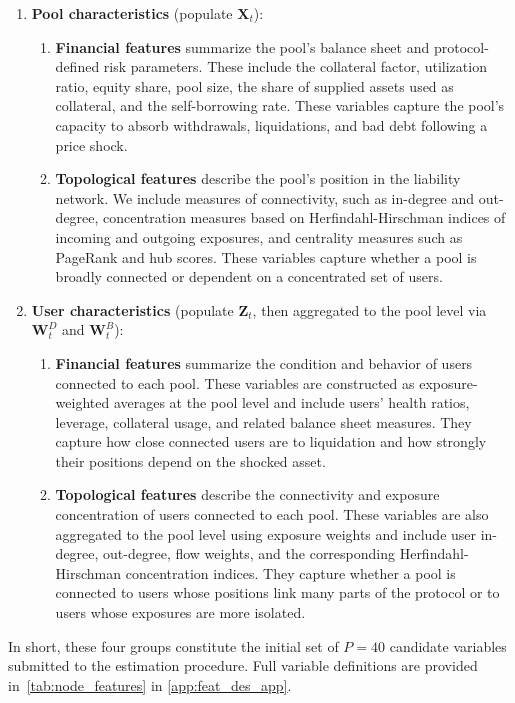 \documentclass[a4paper,UKenglish,cleveref, autoref, thm-restate]{informs3}
\begin{document}
\begin{enumerate}
\item \textbf{Pool characteristics} (populate $\mathbf{X}_t$):
\begin{enumerate}[label=\arabic{enumi}.\arabic*.]
    \item \textbf{Financial features} summarize the pool's balance sheet and protocol-defined risk parameters. These include the collateral factor, utilization ratio, equity share, pool size, the share of supplied assets used as collateral, and the self-borrowing rate. These variables capture the pool's capacity to absorb withdrawals, liquidations, and bad debt following a price shock.
    \item \textbf{Topological features} describe the pool's position in the liability network. We include measures of connectivity, such as in-degree and out-degree, concentration measures based on Herfindahl-Hirschman indices of incoming and outgoing exposures, and centrality measures such as PageRank and hub scores. These variables capture whether a pool is broadly connected or dependent on a concentrated set of users.
\end{enumerate}
\item \textbf{User characteristics} (populate $\mathbf{Z}_t$, then aggregated to the pool level via $\mathbf{W}^D_t$ and $\mathbf{W}^B_t$):
\begin{enumerate}[label=\arabic{enumi}.\arabic*.]
    \item \textbf{Financial features} summarize the condition and behavior of users connected to each pool. These variables are constructed as exposure-weighted averages at the pool level and include users' health ratios, leverage, collateral usage, and related balance sheet measures. They capture how close connected users are to liquidation and how strongly their positions depend on the shocked asset.
    \item \textbf{Topological features} describe the connectivity and exposure concentration of users connected to each pool. These variables are also aggregated to the pool level using exposure weights and include user in-degree, out-degree, flow weights, and the corresponding Herfindahl-Hirschman concentration indices. They capture whether a pool is connected to users whose positions link many parts of the protocol or to users whose exposures are more isolated.
\end{enumerate}
\end{enumerate}

In short, these four groups constitute the initial set of $P = 40$ candidate variables submitted to the estimation procedure. Full variable definitions are provided in~\autoref{tab:node_features} in \ref{app:feat_des_app}.
\end{document}
